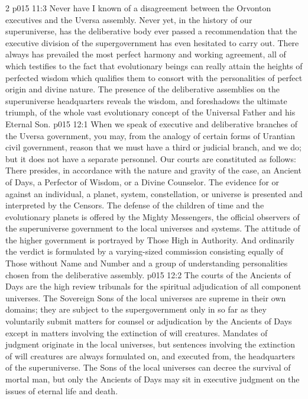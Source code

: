 \begin{multicols}{2}
\vs p015 11:3 Never have I known of a disagreement between the Orvonton executives and the Uversa assembly. Never yet, in the history of our superuniverse, has the deliberative body ever passed a recommendation that the executive division of the supergovernment has even hesitated to carry out. There always has prevailed the most perfect harmony and working agreement, all of which testifies to the fact that evolutionary beings can really attain the heights of perfected wisdom which qualifies them to consort with the personalities of perfect origin and divine nature. The presence of the deliberative assemblies on the superuniverse headquarters reveals the wisdom, and foreshadows the ultimate triumph, of the whole vast evolutionary concept of the Universal Father and his Eternal Son.
\vs p015 12:1 When we speak of executive and deliberative branches of the Uversa government, you may, from the analogy of certain forms of Urantian civil government, reason that we must have a third or judicial branch, and we do; but it does not have a separate personnel. Our courts are constituted as follows: There presides, in accordance with the nature and gravity of the case, an Ancient of Days, a Perfector of Wisdom, or a Divine Counselor. The evidence for or against an individual, a planet, system, constellation, or universe is presented and interpreted by the Censors. The defense of the children of time and the evolutionary planets is offered by the Mighty Messengers, the official observers of the superuniverse government to the local universes and systems. The attitude of the higher government is portrayed by Those High in Authority. And ordinarily the verdict is formulated by a varying\hyp{}sized commission consisting equally of Those without Name and Number and a group of understanding personalities chosen from the deliberative assembly.
\vs p015 12:2 The courts of the Ancients of Days are the high review tribunals for the spiritual adjudication of all component universes. The Sovereign Sons of the local universes are supreme in their own domains; they are subject to the supergovernment only in so far as they voluntarily submit matters for counsel or adjudication by the Ancients of Days except in matters involving the extinction of will creatures. Mandates of judgment originate in the local universes, but sentences involving the extinction of will creatures are always formulated on, and executed from, the headquarters of the superuniverse. The Sons of the local universes can decree the survival of mortal man, but only the Ancients of Days may sit in executive judgment on the issues of eternal life and death.

\end{multicols}
